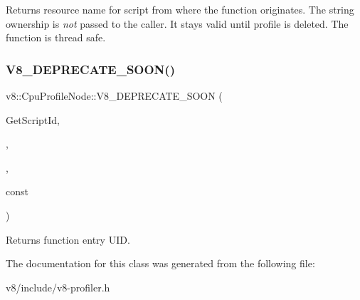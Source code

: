 Returns resource name for script from where the function originates. The string ownership is {\itshape not} passed to the caller. It stays valid until profile is deleted. The function is thread safe. \mbox{\label{classv8_1_1CpuProfileNode_a5285f35c759e2b0afa74f4db0e0bc50c}} 
\subsubsection{\texorpdfstring{V8\+\_\+\+D\+E\+P\+R\+E\+C\+A\+T\+E\+\_\+\+S\+O\+O\+N()}{V8\_DEPRECATE\_SOON()}}
{\footnotesize\ttfamily v8\+::\+Cpu\+Profile\+Node\+::\+V8\+\_\+\+D\+E\+P\+R\+E\+C\+A\+T\+E\+\_\+\+S\+O\+ON (\begin{DoxyParamCaption}\item[{\char`\"{}Use}]{Get\+Script\+Id,  }\item[{\mbox{\hyperlink{classv8_1_1CpuProfileNode_a6616c8d1893da19183d57e6488eb2743}{Get\+Line\+Number}}}]{,  }\item[{and \mbox{\hyperlink{classv8_1_1CpuProfileNode_a9df61090cf365f1f03d5bce44653f1f5}{Get\+Column\+Number}} instead.\char`\"{}}]{,  }\item[{unsigned Get\+Call\+Uid()}]{const }\end{DoxyParamCaption})}

Returns function entry U\+ID. 

The documentation for this class was generated from the following file\+:\begin{DoxyCompactItemize}
\item 
v8/include/v8-\/profiler.\+h\end{DoxyCompactItemize}
